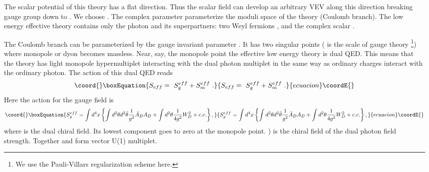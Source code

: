 \documentclass[a4paper,12pt]{article}
\begin{document}
The scalar potential of this theory has a flat direction. Thus
the scalar field can develop an arbitrary VEV along this
direction breaking \coordHE{} gauge group down to \coordHE{}. We choose
\coordHE{}. The
complex parameter \coordHE{} parameterize the moduli
space of the theory (Coulomb branch). The low energy effective
theory contains only the photon \coordHE{} and its
superpartners: two Weyl fermions \coordHE{}, \coordHE{}
and the complex scalar \coordHE{}.

The Coulomb branch can be parameterized by the gauge invariant parameter
\coordHE{}. It
 has two singular points \coordHE{}
( \myHighlight{$\Lambda$}\coordHE{} is the scale of
gauge theory \footnote{We use the Pauli-Villars regularization scheme
here.}) where monopole or dyon becomes massless. Near,
say, the monopole point \coordHE{} the effective low
energy theory is  dual \coordHE{} QED. This means that the theory
has light monopole hypermultiplet interacting with the dual
photon multiplet in the same way as ordinary charges interact
with the ordinary photon. The action of this dual QED reads
\begin{equation}\coord{}\boxEquation{
S_{eff}=\ S^{eff}_g+S^{eff}_m\ .
}{
S_{eff}=\ S^{eff}_g+S^{eff}_m\ .
}{ecuacion}\coordE{}\end{equation}
Here the action for the gauge field is
\begin{equation}\coord{}\boxEquation{
S^{eff}_g=\int d^4x\left\{\int d^2\theta d^2\bar\theta \frac1{g^2}
\bar A_DA_D+\int d^2\theta\frac1{4g^2}W^2_D+c.c.\right\},
}{
S^{eff}_g=\int d^4x\left\{\int d^2\theta d^2\bar\theta \frac1{g^2}
\bar A_DA_D+\int d^2\theta\frac1{4g^2}W^2_D+c.c.\right\},
}{ecuacion}\coordE{}\end{equation}
where \coordHE{} is the  dual chiral \coordHE{} field. Its lowest component
\coordHE{} goes to zero at the monopole point. \coordHE{}  \coordHE{}) is the \coordHE{} chiral field of the dual photon
field strength.  Together \coordHE{} and \coordHE{} form  \coordHE{} vector
U(1) multiplet.
\end{document}
